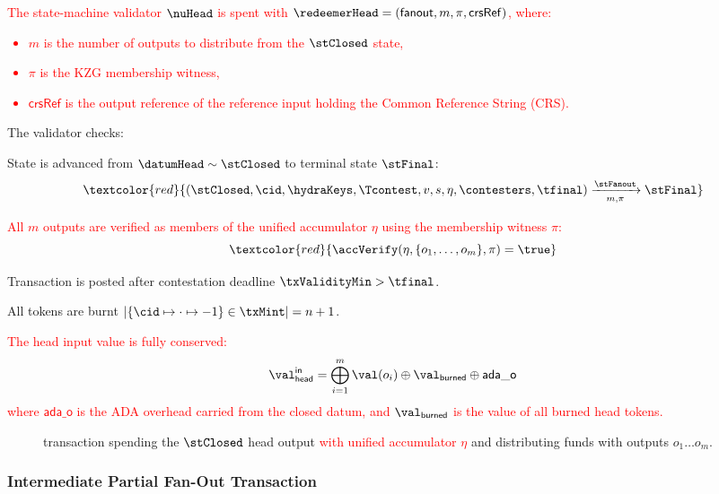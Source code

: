 \noindent \textcolor{red}{The state-machine validator $\nuHead$ is spent with
$\redeemerHead = (\mathsf{fanout}, m, \pi, \mathsf{crsRef})$, where:
\begin{itemize}
  \item $m$ is the number of outputs to distribute from the $\stClosed$ state,
  \item $\pi$ is the KZG membership witness,
  \item $\mathsf{crsRef}$ is the output reference of the reference input holding the Common Reference String (CRS).
\end{itemize}}
The validator checks:
\begin{menumerate}
	\item State is advanced from $\datumHead \sim \stClosed$ to terminal state $\stFinal$:
	\[
		\textcolor{red}{(\stClosed,\cid,\hydraKeys,\Tcontest,v, s,\eta,\contesters,\tfinal) \xrightarrow[m,\pi]{\stFanout} \stFinal}
	\]
	\item \textcolor{red}{All $m$ outputs are verified as members of the unified accumulator $\eta$ using the membership witness $\pi$:}
	\[
		\textcolor{red}{\accVerify(\eta, \{o_1, \ldots, o_m\}, \pi) = \true}
	\]
	\item Transaction is posted after contestation deadline $\txValidityMin > \tfinal$.
	\item All tokens are burnt
	$|\{\cid \mapsto \cdot \mapsto -1\} \in \txMint| = n + 1$.
	\item \textcolor{red}{The head input value is fully conserved:
	\[
		\val_{\mathsf{head}}^{\mathsf{in}} = \bigoplus_{i=1}^{m} \val(o_i) \oplus \val_{\mathsf{burned}} \oplus \mathsf{ada\_o}
	\]
	where $\mathsf{ada\_o}$ is the ADA overhead carried from the closed datum, and $\val_{\mathsf{burned}}$ is the value of all burned head tokens.}
\end{menumerate}

\begin{figure}[H]
	\centering
	
	\caption{\mtxFanout{} transaction spending the $\stClosed$ head output \textcolor{red}{with unified accumulator $\eta$} and
		distributing funds with outputs $o_{1} \dots o_{m}$.}\label{fig:fanoutTx}
\end{figure}

\subsubsection{Intermediate Partial Fan-Out Transaction}\label{sec:partial-fanout-tx}

